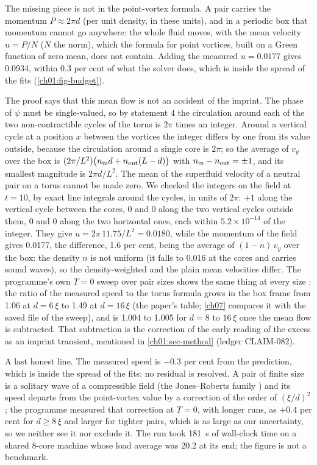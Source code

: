 The missing piece is not in the point-vortex formula. A pair carries the momentum $P\approx2\pi d$ (per unit density, in these units), and in a periodic box that momentum cannot go anywhere: the whole fluid moves, with the mean velocity $u=P/N$ ($N$ the norm), which the formula for point vortices, built on a Green function of zero mean, does not contain. Adding the measured $u=0.0177$ gives 0.0934, within 0.3 per cent of what the solver does, which is inside the spread of the fits (\cref{ch01:fig-budget}).

The proof says that this mean flow is not an accident of the imprint. The phase of $\psi$ must be single-valued, so by statement 4 the circulation around each of the two non-contractible cycles of the torus is $2\pi$ times an integer. Around a vertical cycle at a position $x$ between the vortices the integer differs by one from its value outside, because the circulation around a single core is $2\pi$; so the average of $v_y$ over the box is $(2\pi/L^2)\bigl(n_{\rm in}d+n_{\rm out}(L-d)\bigr)$ with $n_{\rm in}-n_{\rm out}=\pm1$, and its smallest magnitude is $2\pi d/L^2$. The mean of the superfluid velocity of a neutral pair on a torus cannot be made zero. We checked the integers on the field at $t=10$, by exact line integrals around the cycles, in units of $2\pi$: $+1$ along the vertical cycle between the cores, $0$ and $0$ along the two vertical cycles outside them, $0$ and $0$ along the two horizontal ones, each within $5.2\times10^{-14}$ of the integer. They give $u=2\pi\,11.75/L^2=0.0180$, while the momentum of the field gives 0.0177, the difference, 1.6 per cent, being the average of $(1-n)\,v_y$ over the box: the density $n$ is not uniform (it falls to 0.016 at the cores and carries sound waves), so the density-weighted and the plain mean velocities differ. The programme's own $T=0$ sweep over pair sizes shows the same thing at every size \cite{Callens2026a}: the ratio of the measured speed to the torus formula grows in the box frame from 1.06 at $d=6\,\xi$ to 1.49 at $d=16\,\xi$ (the paper's table; \cref{ch07} compares it with the saved file of the sweep), and is 1.004 to 1.005 for $d=8$ to $16\,\xi$ once the mean flow is subtracted. That subtraction is the correction of the early reading of the excess as an imprint transient, mentioned in \cref{ch01:sec-method} (ledger CLAIM-082).

A last honest line. The measured speed is $-0.3$ per cent from the prediction, which is inside the spread of the fits: no residual is resolved. A pair of finite size is a solitary wave of a compressible field (the Jones--Roberts family \cite{JonesRoberts1982}) and its speed departs from the point-vortex value by a correction of the order of $(\xi/d)^2$; the programme measured that correction at $T=0$, with longer runs, as $+0.4$ per cent for $d\ge8\,\xi$ and larger for tighter pairs, which is as large as our uncertainty, so we neither see it nor exclude it. The run took 181~s of wall-clock time on a shared 8-core machine whose load average was 20.2 at its end; the figure is not a benchmark.

